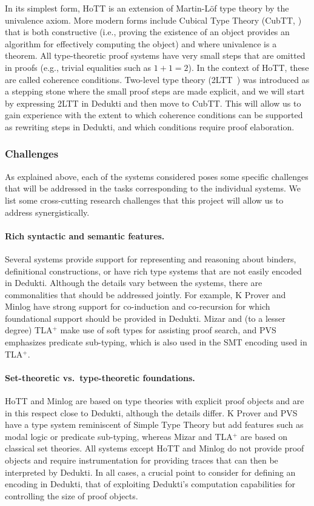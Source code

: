 In its simplest form, HoTT is an extension of Martin-L\"of type theory by the
univalence axiom. More modern forms include Cubical Type Theory (CubTT,
\cite{cohen:cubical}) that is both constructive (i.e., proving the existence of
an object provides an algorithm for effectively computing the object) and where
univalence is a theorem. All type-theoretic proof systems have very small steps
that are omitted in proofs (e.g., trivial equalities such as $1+1=2$). In the
context of HoTT, these are called coherence conditions. Two-level type theory
(2LTT~\cite{annenkov:two-level}) was introduced as a stepping stone where the
small proof steps are made explicit, and we will start by expressing 2LTT in
Dedukti and then move to CubTT. This will allow us to gain experience with
the extent to which coherence conditions can be supported as rewriting steps in
Dedukti, and which conditions require proof elaboration.

\subsubsection*{Challenges}

As explained above, each of the systems considered poses some specific
challenges that will be addressed in the tasks corresponding to the
individual systems. We list some cross-cutting research challenges
that this project will allow us to address synergistically.

\paragraph*{Rich syntactic and semantic features.}
Several systems provide support for representing and reasoning about
binders, definitional constructions, or have rich type systems that
are not easily encoded in Dedukti.  Although the details vary between the systems,
there are commonalities that should be addressed jointly. For example,
K Prover and Minlog have strong support for co-induction and co-recursion
for which foundational support should be provided in Dedukti. Mizar
and (to a lesser degree) TLA$^+$ make use of soft types for assisting
proof search, and PVS emphasizes predicate sub-typing, which is also
used in the SMT encoding used in TLA$^+$.

\paragraph*{Set-theoretic vs.\ type-theoretic foundations.}
HoTT and Minlog are based on type theories with explicit proof objects and are
in this respect close to Dedukti, although the details differ. K Prover
and PVS have a type system reminiscent of Simple Type Theory but add features
such as modal logic or predicate sub-typing, whereas Mizar and TLA$^+$ are based
on classical set theories. All systems except HoTT and Minlog do not provide
proof objects and require instrumentation for providing traces that can then be
interpreted by Dedukti. In all cases, a crucial point to consider for defining
an encoding in Dedukti, that of exploiting
Dedukti's computation capabilities for controlling the size of proof objects.

